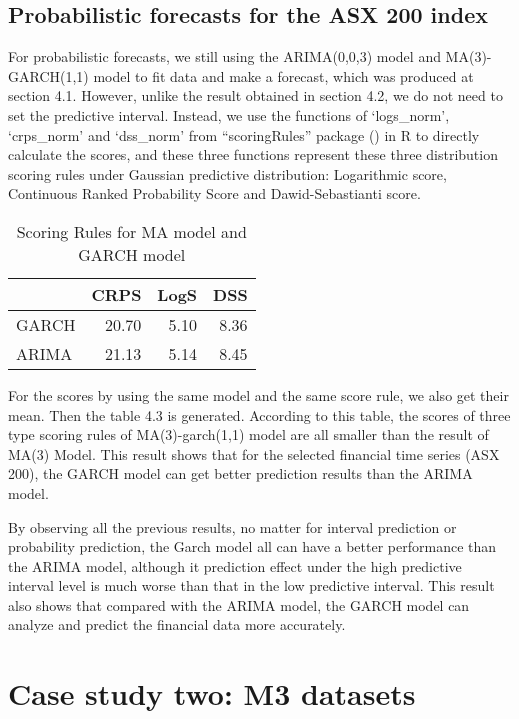 \documentclass{monashthesis}
\theoremstyle{definition}
\theoremstyle{definition}
\theoremstyle{definition}
\theoremstyle{remark}
\begin{document}
\section{Probabilistic forecasts for the ASX 200
index}\label{probabilistic-forecasts-for-the-asx-200-index}

For probabilistic forecasts, we still using the ARIMA(0,0,3) model and
MA(3)-GARCH(1,1) model to fit data and make a forecast, which was
produced at section 4.1. However, unlike the result obtained in section
4.2, we do not need to set the predictive interval. Instead, we use the
functions of `logs\_norm', `crps\_norm' and `dss\_norm' from
``scoringRules'' package (\textcite{JKL17}) in R to directly calculate
the scores, and these three functions represent these three distribution
scoring rules under Gaussian predictive distribution: Logarithmic score,
Continuous Ranked Probability Score and Dawid-Sebastianti score.

\begin{table}

\caption{\label{tab:table2}Scoring Rules for MA model and GARCH model}
\centering
\begin{tabular}[t]{lrrr}
\toprule
  & CRPS & LogS & DSS\\
\midrule
GARCH & 20.70 & 5.10 & 8.36\\
ARIMA & 21.13 & 5.14 & 8.45\\
\bottomrule
\end{tabular}
\end{table}

For the scores by using the same model and the same score rule, we also
get their mean. Then the table 4.3 is generated. According to this
table, the scores of three type scoring rules of MA(3)-garch(1,1) model
are all smaller than the result of MA(3) Model. This result shows that
for the selected financial time series (ASX 200), the GARCH model can
get better prediction results than the ARIMA model.

By observing all the previous results, no matter for interval prediction
or probability prediction, the Garch model all can have a better
performance than the ARIMA model, although it prediction effect under
the high predictive interval level is much worse than that in the low
predictive interval. This result also shows that compared with the ARIMA
model, the GARCH model can analyze and predict the financial data more
accurately.

\chapter{Case study two: M3 datasets}\label{case-study-two-m3-datasets}
\end{document}
